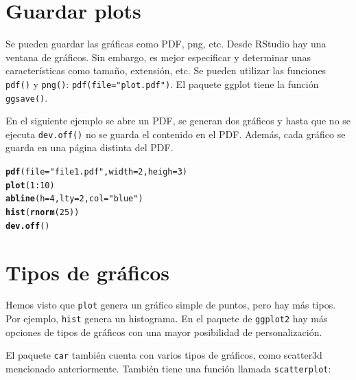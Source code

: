 \documentclass{config/apuntes}\usepackage[]{graphicx}\usepackage[]{xcolor}
\makeatletter
\newcommand{\hlnum}[1]{\textcolor[rgb]{0.686,0.059,0.569}{#1}}%
\newcommand{\hlsng}[1]{\textcolor[rgb]{0.192,0.494,0.8}{#1}}%
\newcommand{\hlopt}[1]{\textcolor[rgb]{0,0,0}{#1}}%
\newcommand{\hldef}[1]{\textcolor[rgb]{0.345,0.345,0.345}{#1}}%
\newcommand{\hlkwc}[1]{\textcolor[rgb]{0.333,0.667,0.333}{#1}}%
\newcommand{\hlkwd}[1]{\textcolor[rgb]{0.737,0.353,0.396}{\textbf{#1}}}%
\newenvironment{kframe}{%
 \def\at@end@of@kframe{}%
 \ifinner\ifhmode%
  \def\at@end@of@kframe{\end{minipage}}%
  \begin{minipage}{\columnwidth}%
 \fi\fi%
 \def\FrameCommand##1{\hskip\@totalleftmargin \hskip-\fboxsep
 \colorbox{shadecolor}{##1}\hskip-\fboxsep
     \hskip-\linewidth \hskip-\@totalleftmargin \hskip\columnwidth}%
 \MakeFramed {\advance\hsize-\width
   \@totalleftmargin\z@ \linewidth\hsize
   \@setminipage}}%
 {\par\unskip\endMakeFramed%
 \at@end@of@kframe}
\newenvironment{knitrout}{}{} %
\newcommand{\code}[1]{\texttt{#1}}
\makeatother
\begin{document}
\section{Guardar plots}
Se pueden guardar las gráficas como PDF, png, etc. Desde RStudio hay una ventana de gráficos. Sin embargo, es mejor especificar y determinar unas características como tamaño, extensión, etc. Se pueden utilizar las funciones \code{pdf()} y \code{png()}: \code{pdf(file="plot.pdf")}. El paquete ggplot tiene la función \code{ggsave()}.

En el siguiente ejemplo se abre un PDF, se generan dos gráficos y hasta que no se ejecuta \code{dev.off()} no se guarda el contenido en el PDF. Además, cada gráfico se guarda en una página distinta del PDF. 
\begin{knitrout}
\color{fgcolor}\begin{kframe}
\begin{alltt}
\hlkwd{pdf}\hldef{(}\hlkwc{file} \hldef{=} \hlsng{"file1.pdf"}\hldef{,} \hlkwc{width} \hldef{=} \hlnum{2}\hldef{,} \hlkwc{heigh} \hldef{=} \hlnum{3}\hldef{)}
\hlkwd{plot}\hldef{(}\hlnum{1}\hlopt{:}\hlnum{10}\hldef{)}
\hlkwd{abline}\hldef{(}\hlkwc{h} \hldef{=} \hlnum{4}\hldef{,} \hlkwc{lty} \hldef{=} \hlnum{2}\hldef{,} \hlkwc{col} \hldef{=} \hlsng{"blue"}\hldef{)}
\hlkwd{hist}\hldef{(}\hlkwd{rnorm}\hldef{(}\hlnum{25}\hldef{))}
\hlkwd{dev.off}\hldef{()}
\end{alltt}
\end{kframe}
\end{knitrout}

\section{Tipos de gráficos}
Hemos visto que \code{plot} genera un gráfico simple de puntos, pero hay más tipos. Por ejemplo, \code{hist} genera un histograma. En el paquete de \code{ggplot2} hay más opciones de tipos de gráficos con una mayor posibilidad de personalización.

El paquete \code{car} también cuenta con varios tipos de gráficos, como scatter3d mencionado anteriormente. También tiene una función llamada \code{scatterplot}:
\end{document}
